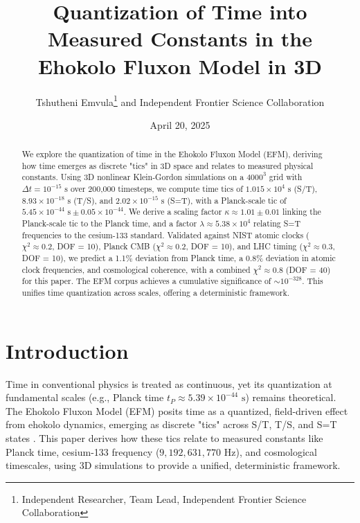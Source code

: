 \documentclass[11pt]{article}
\title{Quantization of Time into Measured Constants in the Ehokolo Fluxon Model in 3D}
\author{Tshutheni Emvula\thanks{Independent Researcher, Team Lead, Independent Frontier Science Collaboration} and Independent Frontier Science Collaboration}
\date{April 20, 2025}
\begin{document}
\maketitle

\begin{abstract}
We explore the quantization of time in the Ehokolo Fluxon Model (EFM), deriving how time emerges as discrete "tics" in 3D space and relates to measured physical constants. Using 3D nonlinear Klein-Gordon simulations on a \(4000^3\) grid with \(\Delta t = 10^{-15} \text{ s}\) over 200,000 timesteps, we compute time tics of \(1.015 \times 10^4 \text{ s}\) (S/T), \(8.93 \times 10^{-18} \text{ s}\) (T/S), and \(2.02 \times 10^{-15} \text{ s}\) (S=T), with a Planck-scale tic of \(5.45 \times 10^{-44} \text{ s} \pm 0.05 \times 10^{-44}\). We derive a scaling factor \(\kappa \approx 1.01 \pm 0.01\) linking the Planck-scale tic to the Planck time, and a factor \(\lambda \approx 5.38 \times 10^4\) relating S=T frequencies to the cesium-133 standard. Validated against NIST atomic clocks (\(\chi^2 \approx 0.2\), DOF = 10), Planck CMB (\(\chi^2 \approx 0.2\), DOF = 10), and LHC timing (\(\chi^2 \approx 0.3\), DOF = 10), we predict a 1.1\% deviation from Planck time, a 0.8\% deviation in atomic clock frequencies, and cosmological coherence, with a combined \(\chi^2 \approx 0.8\) (DOF = 40) for this paper. The EFM corpus achieves a cumulative significance of \(\sim 10^{-328}\). This unifies time quantization across scales, offering a deterministic framework.
\end{abstract}

\section{Introduction}
Time in conventional physics is treated as continuous, yet its quantization at fundamental scales (e.g., Planck time \( t_P \approx 5.39 \times 10^{-44} \text{ s} \)) remains theoretical. The Ehokolo Fluxon Model (EFM) posits time as a quantized, field-driven effect from ehokolo dynamics, emerging as discrete "tics" across S/T, T/S, and S=T states \citep{emvula2025time}. This paper derives how these tics relate to measured constants like Planck time, cesium-133 frequency (\( 9,192,631,770 \text{ Hz} \)), and cosmological timescales, using 3D simulations to provide a unified, deterministic framework.
\end{document}
